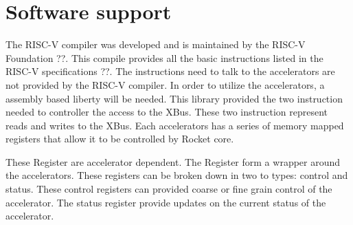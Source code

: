 \documentclass[../main.tex]{subfiles}
\begin{document}
\section{Software support}
The RISC-V compiler was developed and is maintained by the RISC-V Foundation ??. This compile provides all the basic instructions listed in the RISC-V specifications ??. The instructions need to talk to the accelerators are not provided by the RISC-V compiler. In order to utilize the accelerators, a assembly based liberty will be needed. This library provided the two instruction needed to controller the access to the XBus. These two instruction represent reads and writes to the XBus. Each accelerators has a series of memory mapped registers that allow it to be controlled by Rocket core. 

These Register are accelerator dependent. The Register form a wrapper around the accelerators. These registers can be broken down in two to types: control and status. These control registers can provided coarse or fine grain control of the accelerator. The status register provide updates on the current status of the accelerator.  
\end{document}
